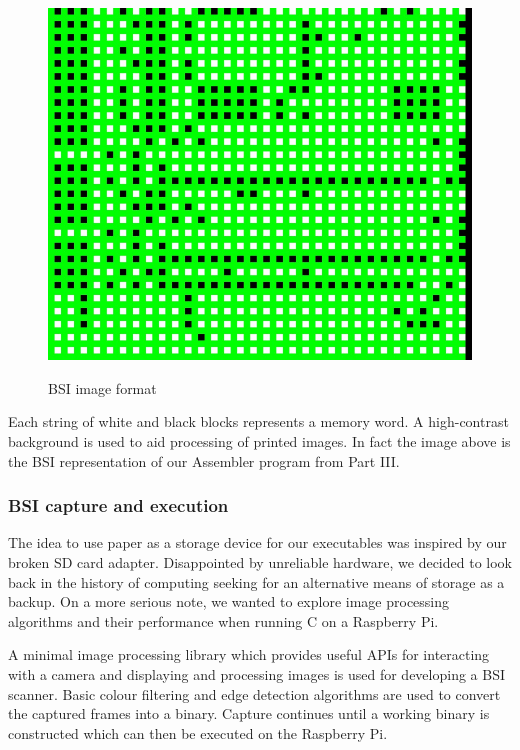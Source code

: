 \documentclass[11pt]{article}
\begin{document}
\begin{figure}[h]
\caption{BSI image format}
\centering
\includegraphics[scale=0.4]{images/gpio.jpeg}
\label{fig:bsi}
\end{figure}

Each string of white and black blocks represents a memory word. A high-contrast background is used to aid processing of printed images. In fact the image above is the BSI representation of our Assembler program from Part III.

\subsubsection{BSI capture and execution}
The idea to use paper as a storage device for our executables was inspired by our broken SD card adapter. Disappointed by unreliable hardware, we decided to look back in the history of computing seeking for an alternative means of storage as a backup. On a more serious note, we wanted to explore image processing algorithms and their performance when running C on a Raspberry Pi.

A minimal image processing library \cite{imgproc} which provides useful APIs for interacting with a camera and displaying and processing images is used for developing a BSI scanner. Basic colour filtering and edge detection algorithms are used to convert the captured frames into a binary. Capture continues until a working binary is constructed which can then be executed on the Raspberry Pi.
\end{document}
